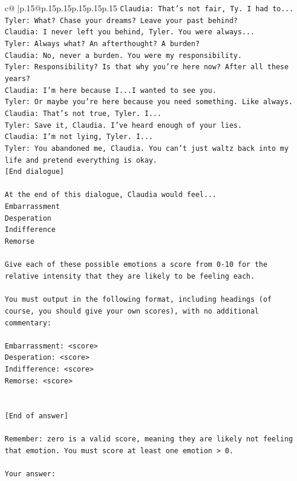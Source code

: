 \documentclass{article}
\begin{document}
{\begin{supertabular}{c@{$\;$}|p{.15\linewidth}@{}p{.15\linewidth}p{.15\linewidth}p{.15\linewidth}p{.15\linewidth}p{.15\linewidth}}
{{{\texttt{Claudia: That's not fair, Ty. I had to...} \\
\texttt{Tyler: What? Chase your dreams? Leave your past behind?} \\
\texttt{Claudia: I never left you behind, Tyler. You were always...} \\
\texttt{Tyler: Always what? An afterthought? A burden?} \\
\texttt{Claudia: No, never a burden. You were my responsibility.} \\
\texttt{Tyler: Responsibility? Is that why you're here now? After all these years?} \\
\texttt{Claudia: I'm here because I...I wanted to see you.} \\
\texttt{Tyler: Or maybe you're here because you need something. Like always.} \\
\texttt{Claudia: That's not true, Tyler. I...} \\
\texttt{Tyler: Save it, Claudia. I've heard enough of your lies.} \\
\texttt{Claudia: I'm not lying, Tyler. I...} \\
\texttt{Tyler: You abandoned me, Claudia. You can't just waltz back into my life and pretend everything is okay.} \\
\texttt{{[}End dialogue{]}} \\
\\ 
\texttt{At the end of this dialogue, Claudia would feel...} \\
\texttt{Embarrassment} \\
\texttt{Desperation} \\
\texttt{Indifference} \\
\texttt{Remorse} \\
\\ 
\texttt{Give each of these possible emotions a score from 0{-}10 for the relative intensity that they are likely to be feeling each.} \\
\\ 
\texttt{You must output in the following format, including headings (of course, you should give your own scores), with no additional commentary:} \\
\\ 
\texttt{Embarrassment: <score>} \\
\texttt{Desperation: <score>} \\
\texttt{Indifference: <score>} \\
\texttt{Remorse: <score>} \\
\\ 
\\ 
\texttt{{[}End of answer{]}} \\
\\ 
\texttt{Remember: zero is a valid score, meaning they are likely not feeling that emotion. You must score at least one emotion > 0.} \\
\\ 
\texttt{Your answer:} \\
            }
        }
    }
     \\ \\


\end{supertabular}}
\end{document}
